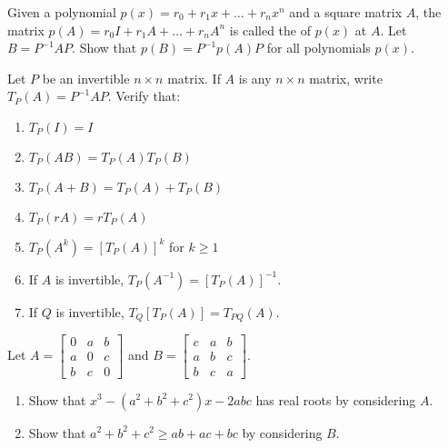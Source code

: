 \documentclass{ximera}
\begin{document}
\begin{problem}\label{prob:similar_poly_eval}
Given a polynomial $p(x) = r_{0} + r_{1}x + \dots + r_{n}x^{n}$ and a square matrix $A$, the matrix $p(A) = r_{0}I + r_{1}A + \dots  + r_{n}A^{n}$ is called the  of $p(x)$ at $A$. Let $B = P^{-1}AP$. Show that $p(B) = P^{-1}p(A)P$ for all polynomials $p(x)$.
\end{problem}

\begin{problem}\label{prob:5_5_12}
Let $P$ be an invertible $n \times n$ matrix. If $A$ is any $n \times n$ matrix, write $T_{P}(A) = P^{-1}AP$. Verify that:

\begin{enumerate}
\item\label{prob:5_5_12a} $T_{P}(I) = I$
\item\label{prob:5_5_12b} $T_{P}(AB) = T_{P}(A)T_{P}(B)$
\item\label{prob:5_5_12c} $T_{P}(A + B) = T_{P}(A) + T_{P}(B)$
\item\label{prob:5_5_12d} $T_{P}(rA) = rT_{P}(A)$
\item\label{prob:5_5_12e} $T_{P}(A^{k}) = [T_{P}(A)]^{k}$ for $k \geq 1$
\item\label{prob:5_5_12f} If $A$ is invertible, $T_{P}(A^{-1}) = [T_{P}(A)]^{-1}$.
\item\label{prob:5_5_12g} If $Q$ is invertible, $T_{Q}[T_{P}(A)] = T_{PQ}(A)$.
\end{enumerate}

\end{problem}



\begin{problem}
Let $A = \begin{bmatrix}
0 & a & b \\
a & 0 & c \\
b & c & 0	
\end{bmatrix}$ and $B =
\begin{bmatrix}
c & a & b \\
a & b & c \\
b & c & a
\end{bmatrix}$.

\begin{enumerate}
\item Show that $x^{3} - (a^{2} + b^{2} + c^{2})x - 2abc$ has real roots by considering $A$.

\item Show that $a^{2} + b^{2} + c^{2} \geq ab + ac + bc$ by considering $B$.
\end{enumerate}
\end{problem}
\end{document}
